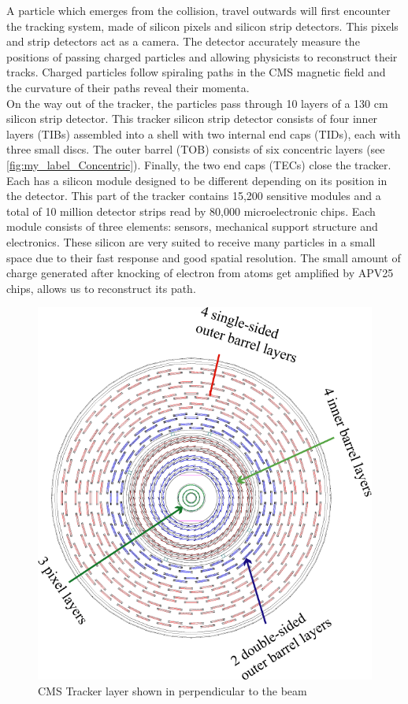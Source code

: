 A particle which emerges from the collision, travel outwards will first encounter the tracking system, made of silicon pixels and silicon strip detectors\cite{Sirunyan_2021}. This pixels and strip detectors act as a camera. The detector accurately measure the positions of passing charged particles and allowing physicists to reconstruct their tracks. Charged particles follow spiraling paths in the CMS magnetic field and the curvature of their paths reveal their momenta.\cite{CMS_3}\\
On the way out of the tracker, the particles pass through 10 layers of a 130 cm silicon strip detector. This tracker silicon strip detector consists of four inner  layers (TIBs) assembled into a shell with two internal end caps (TIDs), each with three small discs. The outer barrel (TOB) consists of six concentric layers (see \autoref{fig:my_label_Concentric}). Finally, the two end caps (TECs) close  the tracker. Each has a silicon module designed to be different depending on its position in the detector. This part of the tracker contains 15,200  sensitive modules and a total of 10 million detector strips read by 80,000 microelectronic chips. Each module consists of three elements: sensors, mechanical support structure and electronics. These silicon are very suited to receive many particles in a small space due to their fast response and good spatial resolution. The small amount of charge generated after knocking of electron from atoms get amplified by APV25 chips, allows us to reconstruct its path.
\begin{figure}[H]
    \centering
    \includegraphics[scale=0.3]{Detector/Barrel.png}
    \caption{CMS Tracker layer shown in perpendicular to the beam\cite{CMS_6}}
    \label{fig:my_label_Concentric}
\end{figure}

